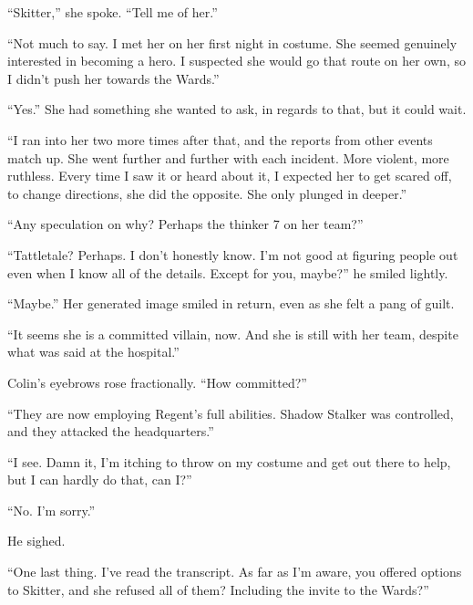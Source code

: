 ``Skitter,'' she spoke.  ``Tell me of her.''



``Not much to say.  I met her on her first night in costume.  She seemed genuinely interested in becoming a hero.  I suspected she would go that route on her own, so I didn't push her towards the Wards.''



``Yes.''  She had something she wanted to ask, in regards to that, but it could wait.



``I ran into her two more times after that, and the reports from other events match up.  She went further and further with each incident.  More violent, more ruthless.  Every time I saw it or heard about it, I expected her to get scared off, to change directions, she did the opposite.  She only plunged in deeper.''



``Any speculation on why?  Perhaps the thinker 7 on her team?''



``Tattletale?  Perhaps.  I don't honestly know.  I'm not good at figuring people out even when I know all of the details.  Except for you, maybe?'' he smiled lightly.



``Maybe.''  Her generated image smiled in return, even as she felt a pang of guilt.



``It seems she is a committed villain, now.  And she is still with her team, despite what was said at the hospital.''



Colin's eyebrows rose fractionally.  ``How committed?''



``They are now employing Regent's full abilities.  Shadow Stalker was controlled, and they attacked the headquarters.''



``I see.  Damn it, I'm itching to throw on my costume and get out there to help, but I can hardly do that, can I?''



``No.  I'm sorry.''



He sighed.



``One last thing.  I've read the transcript.  As far as I'm aware, you offered options to Skitter, and she refused all of them?  Including the invite to the Wards?''



